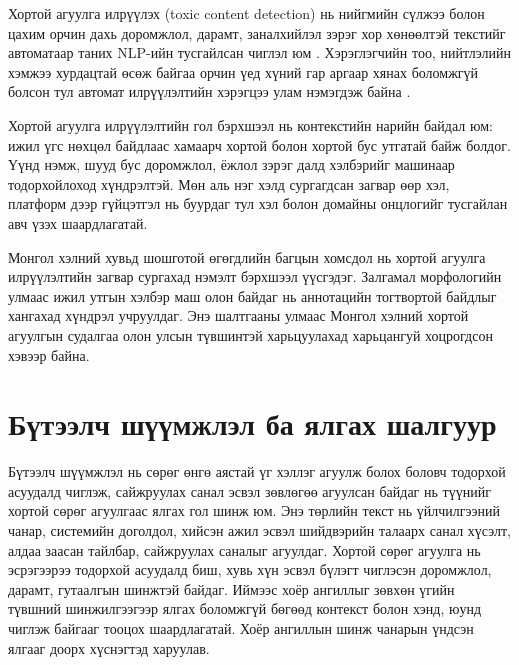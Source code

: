 Хортой агуулга илрүүлэх (toxic content detection) нь нийгмийн сүлжээ болон
цахим орчин дахь доромжлол, дарамт, заналхийлэл зэрэг хор хөнөөлтэй
текстийг автоматаар таних NLP-ийн тусгайлсан чиглэл юм \cite{davidson2017}.
Хэрэглэгчийн тоо, нийтлэлийн хэмжээ хурдацтай өсөж байгаа орчин үед
хүний гар аргаар хянах боломжгүй болсон тул автомат илрүүлэлтийн хэрэгцээ
улам нэмэгдэж байна \cite{vogels2022}.

Хортой агуулга илрүүлэлтийн гол бэрхшээл нь контекстийн нарийн байдал юм:
ижил үгс нөхцөл байдлаас хамаарч хортой болон хортой бус утгатай байж болдог.
Үүнд нэмж, шууд бус доромжлол, ёжлол зэрэг далд хэлбэрийг машинаар
тодорхойлоход хүндрэлтэй. Мөн аль нэг хэлд сургагдсан загвар өөр хэл,
платформ дээр гүйцэтгэл нь буурдаг тул хэл болон домайны онцлогийг тусгайлан
авч үзэх шаардлагатай.

Монгол хэлний хувьд шошготой өгөгдлийн багцын хомсдол нь хортой агуулга
илрүүлэлтийн загвар сургахад нэмэлт бэрхшээл үүсгэдэг. Залгамал
морфологийн улмаас ижил утгын хэлбэр маш олон байдаг нь аннотацийн
тогтвортой байдлыг хангахад хүндрэл учруулдаг. Энэ шалтгааны улмаас
Монгол хэлний хортой агуулгын судалгаа олон улсын түвшинтэй харьцуулахад
харьцангуй хоцрогдсон хэвээр байна.

\section{Бүтээлч шүүмжлэл ба ялгах шалгуур}
\label{sec:constructive}

Бүтээлч шүүмжлэл нь сөрөг өнгө аястай үг хэллэг агуулж болох боловч тодорхой
асуудалд чиглэж, сайжруулах санал эсвэл зөвлөгөө агуулсан байдаг нь
түүнийг хортой сөрөг агуулгаас ялгах гол шинж юм. Энэ төрлийн текст нь
үйлчилгээний чанар, системийн доголдол, хийсэн ажил эсвэл шийдвэрийн
талаарх санал хүсэлт, алдаа заасан тайлбар, сайжруулах саналыг агуулдаг.
Хортой сөрөг агуулга нь эсрэгээрээ тодорхой асуудалд биш, хувь хүн эсвэл
бүлэгт чиглэсэн доромжлол, дарамт, гутаалгын шинжтэй байдаг. Иймээс хоёр
ангиллыг зөвхөн үгийн түвшний шинжилгээгээр ялгах боломжгүй бөгөөд контекст
болон хэнд, юунд чиглэж байгааг тооцох шаардлагатай. Хоёр
ангиллын шинж чанарын үндсэн ялгааг доорх хүснэгтэд харуулав.

